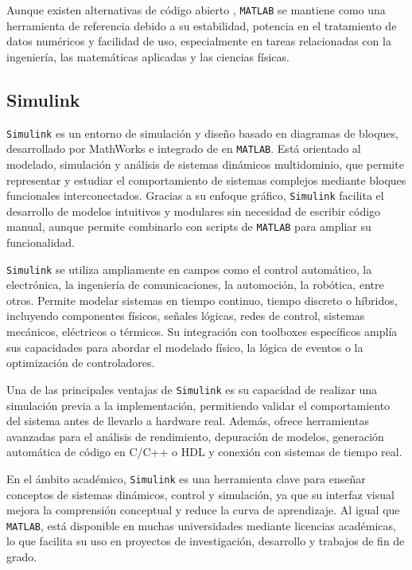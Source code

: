 Aunque existen alternativas de código abierto , \texttt{MATLAB} se mantiene como una herramienta de referencia debido a su estabilidad, potencia en el tratamiento de datos numéricos y facilidad de uso, especialmente en tareas relacionadas con la ingeniería, las matemáticas aplicadas y las ciencias físicas.

\subsection{Simulink}
\texttt{Simulink} \cite{mathworks_simulink} es un entorno de simulación y diseño basado en diagramas de bloques, desarrollado por MathWorks e integrado de en \texttt{MATLAB}. Está orientado al modelado, simulación y análisis de sistemas dinámicos multidominio, que permite representar y estudiar el comportamiento de sistemas complejos mediante bloques funcionales interconectados. Gracias a su enfoque gráfico, \texttt{Simulink} facilita el desarrollo de modelos intuitivos y modulares sin necesidad de escribir código manual, aunque permite combinarlo con scripts de \texttt{MATLAB} para ampliar su funcionalidad.

\texttt{Simulink} se utiliza ampliamente en campos como el control automático, la electrónica, la ingeniería de comunicaciones, la automoción, la robótica, entre otros. Permite modelar sistemas en tiempo continuo, tiempo discreto o híbridos, incluyendo componentes físicos, señales lógicas, redes de control, sistemas mecánicos, eléctricos o térmicos. Su integración con toolboxes específicos amplía sus capacidades para abordar el modelado físico, la lógica de eventos o la optimización de controladores.

Una de las principales ventajas de \texttt{Simulink} es su capacidad de realizar una simulación previa a la implementación, permitiendo validar el comportamiento del sistema antes de llevarlo a hardware real. Además, ofrece herramientas avanzadas para el análisis de rendimiento, depuración de modelos, generación automática de código en C/C++ o HDL y conexión con sistemas de tiempo real.

En el ámbito académico, \texttt{Simulink} es una herramienta clave para enseñar conceptos de sistemas dinámicos, control y simulación, ya que su interfaz visual mejora la comprensión conceptual y reduce la curva de aprendizaje. Al igual que \texttt{MATLAB}, está disponible en muchas universidades mediante licencias académicas, lo que facilita su uso en proyectos de investigación, desarrollo y trabajos de fin de grado.

